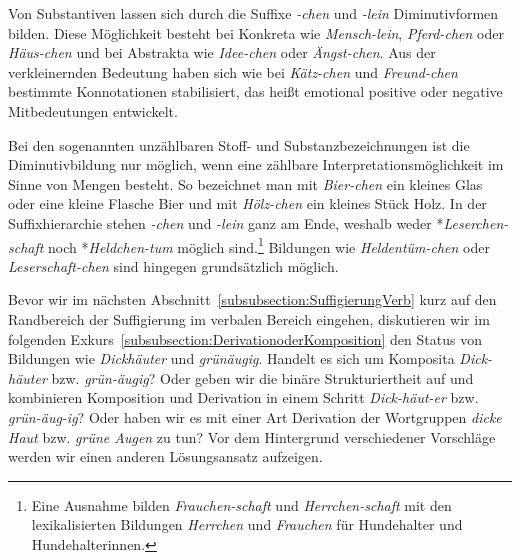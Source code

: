 \label{subsubsection:chen}

Von Substantiven lassen sich durch die Suffixe \textit{-chen} und \textit{-lein} Diminutivformen bilden. Diese Möglichkeit besteht bei Konkreta wie \textit{Mensch-lein}, \textit{Pferd-chen} oder \textit{Häus-chen} und bei Abstrakta wie \textit{Idee-chen} oder \textit{Ängst-chen}. Aus der verkleinernden Bedeutung haben sich wie bei \textit{Kätz-chen} und \textit{Freund-chen} bestimmte Konnotationen stabilisiert, das heißt emotional positive oder negative Mitbedeutungen entwickelt. 

Bei den sogenannten unzählbaren Stoff- und Substanzbezeichnungen ist die Diminutivbildung nur möglich, wenn eine zählbare Interpretationsmöglichkeit im Sinne von Mengen besteht. So bezeichnet man mit \textit{Bier-chen} ein kleines Glas oder eine kleine Flasche Bier und mit \textit{Hölz-chen} ein kleines Stück Holz. In der Suffixhierarchie stehen \textit{-chen} und \textit{-lein} ganz am Ende, weshalb weder *\textit{Leserchen-schaft} noch *\textit{Heldchen-tum} möglich sind.\footnote{Eine Ausnahme bilden \textit{Frauchen-schaft} und \textit{Herrchen-schaft} mit den lexikalisierten Bildungen \textit{Herrchen} und \textit{Frauchen} für Hundehalter und Hundehalterinnen.} Bildungen wie \textit{Heldentüm-chen} oder \textit{Leserschaft-chen} sind hingegen grundsätzlich möglich.

Bevor wir im nächsten Abschnitt~\ref{subsubsection:SuffigierungVerb} kurz auf den Randbereich der Suffigierung im verbalen Bereich eingehen, diskutieren wir im folgenden Exkurs~\ref{subsubsection:DerivationoderKomposition} den Status von Bildungen wie \textit{Dickhäuter} und \textit{grünäugig}. Handelt es sich um Komposita \textit{Dick-häuter} bzw. \textit{grün-äugig}? Oder geben wir die binäre Strukturiertheit auf und kombinieren Komposition und Derivation in einem Schritt \textit{Dick-häut-er} bzw. \textit{grün-äug-ig}? Oder haben wir es mit einer Art Derivation der Wortgruppen \textit{dicke Haut} bzw. \textit{grüne Augen} zu tun? Vor dem Hintergrund verschiedener Vorschläge werden wir einen anderen Lösungsansatz aufzeigen.


